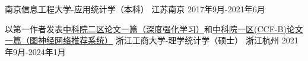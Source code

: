 \begin{educventries}
  \educventry
    {} %
    {南京信息工程大学-应用统计学（本科）} %
    {江苏南京} %
    {2017年9月-2021年6月} %

  \educventry
    {以第一作者发表\href{https://www.frontiersin.org/articles/10.3389/fbioe.2022.827408/full}{中科院二区论文一篇（深度强化学习）}和\href{https://www.sciencedirect.com/science/article/pii/S0020025523006497}{中科院一区(CCF-B)论文一篇（图神经网络推荐系统）}} %
    {浙江工商大学-理学统计学（硕士）} %
    {浙江杭州} %
    {2021年9月-2024年1月} %

\end{educventries}
